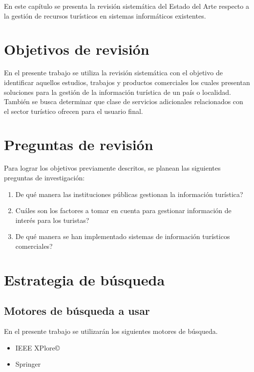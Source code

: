 \documentclass{report}
\begin{document}
En este capítulo se presenta la revisión sistemática del Estado del Arte
respecto a la gestión de recursos turísticos en sistemas informáticos existentes.

\section{Objetivos de revisión}

En el presente trabajo se utiliza la revisión sistemática con el objetivo de
identificar aquellos estudios, trabajos y productos comerciales los cuales presentan
soluciones para la gestión de la información turística de un país o localidad.
También se busca determinar que clase de servicios adicionales relacionados
con el sector turístico ofrecen para el usuario final.

\section{Preguntas de revisión}

Para lograr los objetivos previamente descritos, se planean las siguientes preguntas
de investigación:

\begin{enumerate}
    \item{De qué manera las instituciones públicas gestionan la información
        turística?}
    \item{Cuáles son los factores a tomar en cuenta para gestionar información
        de interés para los turistas?}
    \item{De qué manera se han implementado sistemas de información turísticos
        comerciales?}
\end{enumerate}

\section{Estrategia de búsqueda}

\subsection{Motores de búsqueda a usar}

En el presente trabajo se utilizarán los siguientes motores de búsqueda.

\begin{itemize}
    \item{IEEE XPlore\copyright{}}
    \item{Springer}
\end{itemize}
\end{document}
